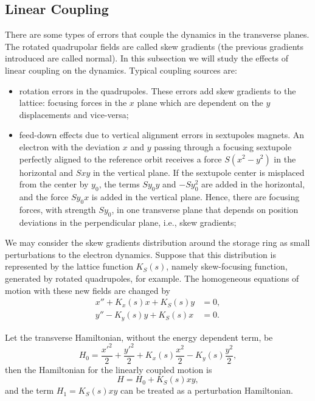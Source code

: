\subsection{Linear Coupling}\label{subsec:linear_coupling}
There are some types of errors that couple the dynamics in the transverse planes. The rotated quadrupolar fields are called skew gradients (the previous gradients introduced are called normal). In this subsection we will study the effects of linear coupling on the dynamics. Typical coupling sources are:
\begin{itemize}
    \item rotation errors in the quadrupoles. These errors add skew gradients to the lattice: focusing forces in the $x$ plane which are dependent on the $y$ displacements and vice-versa;
    \item feed-down effects due to vertical alignment errors in sextupoles magnets. An electron with the deviation $x$ and $y$ passing through a focusing sextupole perfectly aligned to the reference orbit receives a force $S(x^2-y^2)$ in the horizontal and $Sxy$ in the vertical plane. If the sextupole center is misplaced from the center by $y_0$, the terms $Sy_0 y$ and $-Sy_0^2$ are added in the horizontal, and the force $Sy_0 x$ is added in the vertical plane. Hence, there are focusing forces, with strength $Sy_0$, in one transverse plane that depends on position deviations in the perpendicular plane, i.e., skew gradients;
\end{itemize}

We may consider the skew gradients distribution around the storage ring as small perturbations to the electron dynamics. Suppose that this distribution is represented by the lattice function $K_S(s)$, namely skew-focusing function, generated by rotated quadrupoles, for example. The homogeneous equations of motion with these new fields are changed by
\begin{align}
    x'' + K_x(s) x + K_S(s)y &=0, \\
    y'' - K_y(s) y + K_S(s)x &=0.
\end{align}

Let the transverse Hamiltonian, without the energy dependent term, be
\begin{equation*}
H_0 = \dfrac{{x'}^2}{2} + \dfrac{{y'}^2}{2} + K_x(s)\dfrac{{x}^2}{2} - K_y(s) \frac{y^2}{2},    
\end{equation*}
then the Hamiltonian for the linearly coupled motion is 
\begin{equation*}
    H = H_0 + K_S(s) xy,
\end{equation*}
and the term $H_1 = K_S(s) xy$ can be treated as a perturbation Hamiltonian.

